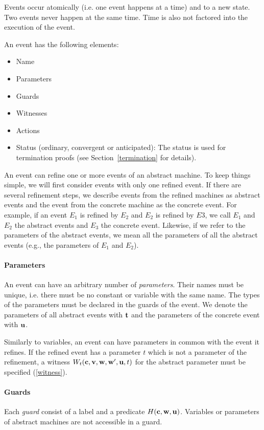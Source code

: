Events occur atomically (i.e. one event happens at a time) and to a new state.
Two events never happen at the same time. Time is also not factored into the execution of the event.

An event has the following elements:
\begin{itemize}
\item Name
\item Parameters
\item Guards
\item Witnesses
\item Actions
\item Status (ordinary, convergent or anticipated): The status is used
  for termination proofs (see Section~\ref{termination} for details).
\end{itemize}

An event can refine one or more events of an abstract machine. To keep things simple, we will
  first consider events with only one refined event.
If there are several refinement steps, we describe events from the refined machines as abstract events and the event from the concrete machine as the concrete event. For example, if an event $E_1$ is refined by $E_2$ and $E_2$ is refined by
  $E3$, we call $E_1$ and $E_2$ the abstract events and $E_3$ the concrete event.
Likewise, if we refer to the parameters of the abstract events, we mean all the parameters
  of all the abstract events (e.g., the parameters of $E_1$ and $E_2$).

\paragraph{Parameters}
\label{parameters}
An event can have an arbitrary number of \emph{parameters}. Their names must be unique, i.e. there must be no constant or variable with the same name.
The types of the parameters must be declared in the guards of the event.
We denote the parameters of all abstract events with $\mathbf{t}$ and the
parameters of the concrete event with $\mathbf{u}$.

Similarly to variables, an event can have parameters in common with the event it refines.
If the refined event has a parameter $t$ which is not a parameter of the refinement, 
 a witness $W_t(\mathbf{c},{\mathbf{v},\mathbf{w}},\mathbf{w}',\mathbf{u},t)$ for
 the abstract parameter must be specified (\ref{witness}).

\paragraph{Guards}
\label{guards}
Each \emph{guard} consist of a label and a predicate $H(\mathbf{c},\mathbf{w},\mathbf{u})$.
Variables or parameters of abstract machines are not accessible in a guard.

